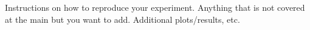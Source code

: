 Instructions on how to reproduce your experiment.
Anything that is not covered at the main but you want to add. Additional plots/results, etc. 